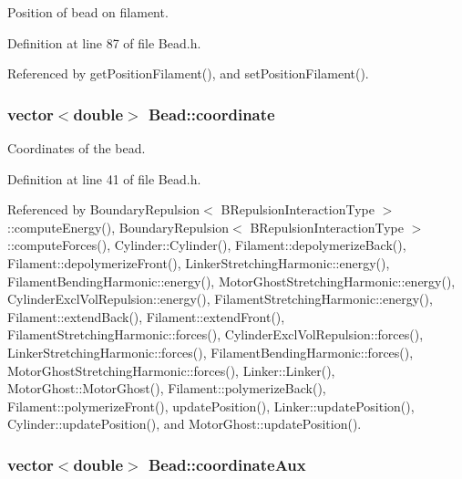 Position of bead on filament. 



Definition at line 87 of file Bead.\+h.



Referenced by get\+Position\+Filament(), and set\+Position\+Filament().

\hypertarget{classBead_a8c9c7d97a682694bf3b16a0922b23786}{
\subsubsection[{coordinate}]{\setlength{\rightskip}{0pt plus 5cm}vector$<$double$>$ Bead\+::coordinate}}\label{classBead_a8c9c7d97a682694bf3b16a0922b23786}


Coordinates of the bead. 



Definition at line 41 of file Bead.\+h.



Referenced by Boundary\+Repulsion$<$ B\+Repulsion\+Interaction\+Type $>$\+::compute\+Energy(), Boundary\+Repulsion$<$ B\+Repulsion\+Interaction\+Type $>$\+::compute\+Forces(), Cylinder\+::\+Cylinder(), Filament\+::depolymerize\+Back(), Filament\+::depolymerize\+Front(), Linker\+Stretching\+Harmonic\+::energy(), Filament\+Bending\+Harmonic\+::energy(), Motor\+Ghost\+Stretching\+Harmonic\+::energy(), Cylinder\+Excl\+Vol\+Repulsion\+::energy(), Filament\+Stretching\+Harmonic\+::energy(), Filament\+::extend\+Back(), Filament\+::extend\+Front(), Filament\+Stretching\+Harmonic\+::forces(), Cylinder\+Excl\+Vol\+Repulsion\+::forces(), Linker\+Stretching\+Harmonic\+::forces(), Filament\+Bending\+Harmonic\+::forces(), Motor\+Ghost\+Stretching\+Harmonic\+::forces(), Linker\+::\+Linker(), Motor\+Ghost\+::\+Motor\+Ghost(), Filament\+::polymerize\+Back(), Filament\+::polymerize\+Front(), update\+Position(), Linker\+::update\+Position(), Cylinder\+::update\+Position(), and Motor\+Ghost\+::update\+Position().

\hypertarget{classBead_a4d46596f52ee0ce95e3e717483e1a921}{
\subsubsection[{coordinate\+Aux}]{\setlength{\rightskip}{0pt plus 5cm}vector$<$double$>$ Bead\+::coordinate\+Aux}}\label{classBead_a4d46596f52ee0ce95e3e717483e1a921}


